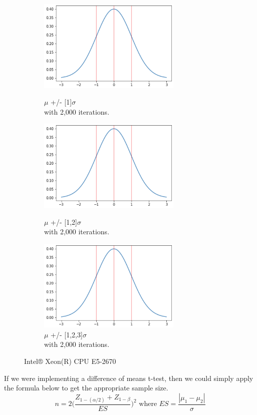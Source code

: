 \documentclass[12pt]{article}
\begin{document}
\begin{figure}[b]
\begin{subfigure}{.32\textwidth}
    \centering
    \includegraphics[width=0.75\textwidth]{sd_3.png}
    \caption[short]{$\mu$ +/- [1]$\sigma$ \\with 2,000 iterations.}
    \includegraphics[width=0.75\textwidth]{sd_3.png}
    \caption[short]{$\mu$ +/- [1,2]$\sigma$ \\with 2,000 iterations.}
    \includegraphics[width=0.75\textwidth]{sd_3.png}
    \caption[short]{$\mu$ +/- [1,2,3]$\sigma$ \\with 2,000 iterations.}
\end{subfigure}%
\caption[short]{Intel® Xeon(R) CPU E5-2670}
\end{figure}


\newpage
If we were implementing a difference of means t-test, then we could simply apply the formula below to get the appropriate sample size.
\[n = 2 \Bigg(\frac{Z_{1-(\alpha/2)}+Z_{1-\beta}}{ES}\Bigg)^2 \text{  where  } ES = \frac{|\mu_1-\mu_2|}{\sigma}\]
\end{document}
